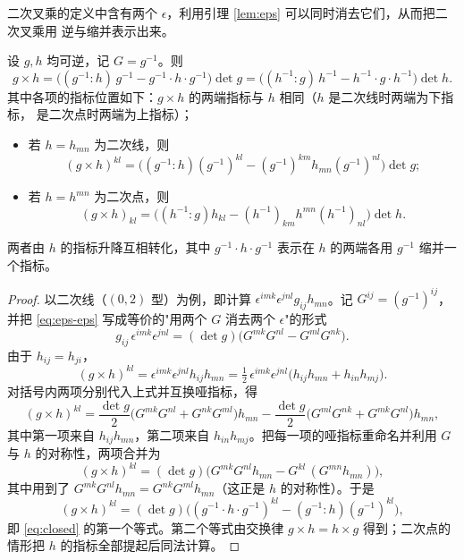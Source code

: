 二次叉乘的定义中含有两个 $\epsilon$，利用引理 \ref{lem:eps} 可以同时消去它们，从而把二次叉乘用
逆与缩并表示出来。

\begin{proposition}[二次叉乘的闭式]
\label{prop:closed}
设 $g,h$ 均可逆，记 $G=g^{-1}$。则
\begin{equation}
\label{eq:closed}
g\times h=\Big((g^{-1}:h)\,g^{-1}-g^{-1}\cdot h\cdot g^{-1}\Big)\det g
=\Big((h^{-1}:g)\,h^{-1}-h^{-1}\cdot g\cdot h^{-1}\Big)\det h .
\end{equation}
其中各项的指标位置如下：$g\times h$ 的两端指标与 $h$ 相同（$h$ 是二次线时两端为下指标，
是二次点时两端为上指标）；
\begin{itemize}[itemsep=2pt]
  \item 若 $h=h_{mn}$ 为二次线，则
        \[
        (g\times h)^{kl}
        =\Big((g^{-1}:h)(g^{-1})^{kl}-(g^{-1})^{km}h_{mn}(g^{-1})^{nl}\Big)\det g ;
        \]
  \item 若 $h=h^{mn}$ 为二次点，则
        \[
        (g\times h)_{kl}
        =\Big((h^{-1}:g)h_{kl}-(h^{-1})_{km}h^{mn}(h^{-1})_{nl}\Big)\det h .
        \]
\end{itemize}
两者由 $h$ 的指标升降互相转化，其中 $g^{-1}\cdot h\cdot g^{-1}$ 表示在 $h$ 的两端各用
$g^{-1}$ 缩并一个指标。
\end{proposition}

\begin{proof}
以二次线（$(0,2)$ 型）为例，即计算 $\epsilon^{imk}\epsilon^{jnl}g_{ij}h_{mn}$。记
$G^{ij}=(g^{-1})^{ij}$，并把 \eqref{eq:eps-eps} 写成等价的"用两个 $G$ 消去两个
$\epsilon$"的形式
\[
g_{ij}\,\epsilon^{imk}\epsilon^{jnl}=(\det g)\big(G^{mk}G^{nl}-G^{ml}G^{nk}\big).
\]
由于 $h_{ij}=h_{ji}$，
\[
(g\times h)^{kl}=\epsilon^{imk}\epsilon^{jnl}h_{ij}h_{mn}
=\tfrac12\,\epsilon^{imk}\epsilon^{jnl}\big(h_{ij}h_{mn}+h_{in}h_{mj}\big).
\]
对括号内两项分别代入上式并互换哑指标，得
\[
(g\times h)^{kl}=\frac{\det g}{2}\Big(G^{mk}G^{nl}+G^{nk}G^{ml}\Big)h_{mn}
-\frac{\det g}{2}\Big(G^{ml}G^{nk}+G^{mk}G^{nl}\Big)h_{mn},
\]
其中第一项来自 $h_{ij}h_{mn}$，第二项来自 $h_{in}h_{mj}$。把每一项的哑指标重命名并利用
$G$ 与 $h$ 的对称性，两项合并为
\[
(g\times h)^{kl}=(\det g)\Big(G^{mk}G^{nl}h_{mn}-G^{kl}\,(G^{mn}h_{mn})\Big),
\]
其中用到了 $G^{mk}G^{nl}h_{mn}=G^{nk}G^{ml}h_{mn}$（这正是 $h$ 的对称性）。于是
\[
(g\times h)^{kl}=(\det g)\Big((g^{-1}\cdot h\cdot g^{-1})^{kl}-(g^{-1}:h)(g^{-1})^{kl}\Big),
\]
即 \eqref{eq:closed} 的第一个等式。第二个等式由交换律 $g\times h=h\times g$ 得到；二次点的
情形把 $h$ 的指标全部提起后同法计算。
\end{proof}

